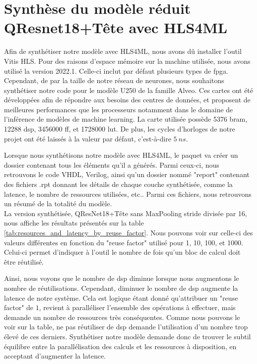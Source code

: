 \section{Synthèse du modèle réduit QResnet18+Tête avec HLS4ML}

Afin de synthétiser notre modèle avec HLS4ML, nous avons dû installer l'outil Vitis HLS. Pour des raisons d'espace mémoire sur la machine utilisée, nous avons utilisé la version 2022.1. Celle-ci inclut par défaut plusieurs types de \acrshort{fpga}. Cependant, de par la taille de notre réseau de neurones, nous souhaitons synthétiser notre code pour le modèle U250 \cite{noauthor_alveo_nodate} de la famille Alveo. Ces cartes ont été développées afin de répondre aux besoins des centres de données, et proposent de meilleures performances que les processeurs notamment dans le domaine de l'inférence de modèles de machine learning. La carte utilisée possède 5376 \acrfull{bram}, 12288 \acrfull{dsp}, 3456000 \acrfull{ff}, et 1728000 \acrfull{lut}. De plus, les cycles d'horloges de notre projet ont été laissés à la valeur par défaut, c'est-à-dire $5 \: ns$.

Lorsque nous synthétisons notre modèle avec HLS4ML, le paquet va créer un dossier contenant tous les éléments qu'il a générés. Parmi ceux-ci, nous retrouvons le code VHDL, Verilog, ainsi qu'un dossier nommé "report" contenant des fichiers .rpt donnant les détails de chaque couche synthétisée, comme la latence, le nombre de ressources utilisées, etc.. Parmi ces fichiers, nous retrouvons un résumé de la totalité du modèle.\\

La version synthétisée, QResNet18+Tête sans MaxPooling stride divisée par 16, nous affiche les résultats présentés sur la table \ref{tab:resources_and_latency_by_reuse_factor}. Nous pouvons voir sur celle-ci des valeurs différentes en fonction du "reuse factor" utilisé pour 1, 10, 100, et 1000. Celui-ci permet d'indiquer à l'outil le nombre de fois qu'un bloc de calcul doit être réutilisé.

Ainsi, nous voyons que le nombre de \acrshort{dsp} diminue lorsque nous augmentons le nombre de réutilisations. Cependant, diminuer le nombre de \acrshort{dsp} augmente la latence de notre système. Cela est logique étant donné qu'attribuer un "reuse factor" de $1$, revient à paralléliser l'ensemble des opérations à effectuer, mais demande un nombre de ressources très conséquentes. Comme nous pouvons le voir sur la table, ne pas réutiliser de \acrshort{dsp} demande l'utilisation d'un nombre trop élevé de ces derniers. Synthétiser notre modèle demande donc de trouver le subtil équilibre entre la parallélisation des calculs et les ressources à disposition, en acceptant d'augmenter la latence.

